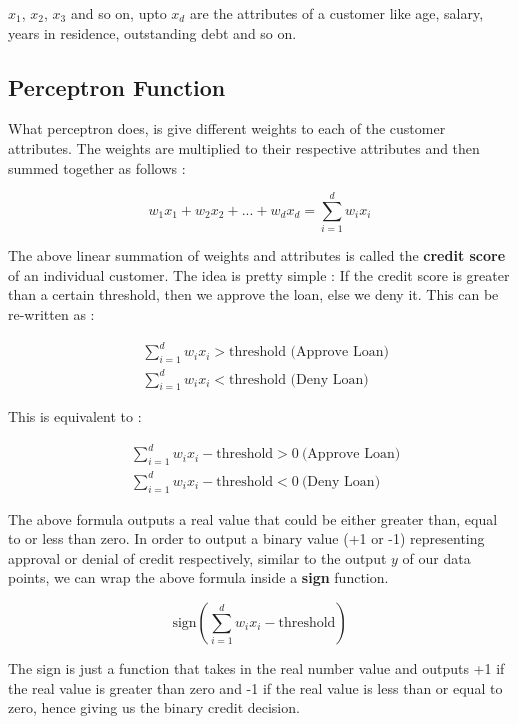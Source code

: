 \documentclass[12pt, letterpaper]{article}
\begin{document}
$x_1$, $x_2$, $x_3$ and so on, upto $x_d$ are the attributes of a customer like age, salary, years in residence, outstanding debt and so on.

\subsection{Perceptron Function}

What perceptron does, is give different weights to each of the customer attributes. The weights are multiplied to their respective attributes and then summed together as follows : 

\begin{displaymath}
    w_1x_1 + w_2x_2 + ... + w_dx_d = \sum_{i = 1}^{d} w_ix_i
\end{displaymath}

The above linear summation of weights and attributes is called the \textbf{credit score} of an individual customer. The idea is pretty simple : If the credit score is greater than a certain threshold, then we approve the loan, else we deny it. This can be re-written as : 

\begin{align*}
    & \sum_{i = 1}^{d} w_ix_i > \text{threshold (Approve Loan)} \\
    & \sum_{i = 1}^{d} w_ix_i < \text{threshold (Deny Loan)}
\end{align*}

This is equivalent to : 

\begin{align*}
    & \sum_{i = 1}^{d} w_ix_i - \text{threshold} > 0 \ (\text{Approve Loan)} \\
    & \sum_{i = 1}^{d} w_ix_i - \text{threshold} < 0 \ (\text{Deny Loan)}
\end{align*}

The above formula outputs a real value that could be either greater than, equal to or less than zero. In order to output a binary value (+1 or -1) representing approval or denial of credit respectively, similar to the output $y$ of our data points, we can wrap the above formula inside a \textbf{sign} function.

\begin{displaymath}
    \text{sign} \left( \sum_{i = 1}^{d} w_ix_i - \text{threshold} \right)
\end{displaymath}

The sign is just a function that takes in the real number value and outputs +1 if the real value is greater than zero and -1 if the real value is less than or equal to zero, hence giving us the binary credit decision.
\end{document}
